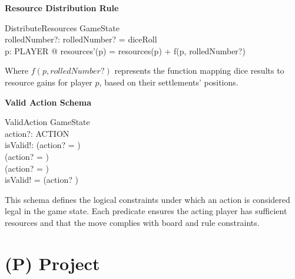 \documentclass{article}
\begin{document}
\textbf{Resource Distribution Rule}

\begin{schema}{DistributeResources}
    \Delta GameState \\
    rolledNumber?: 
    \where
    rolledNumber? = diceRoll \\
    \forall p: PLAYER @ resources'(p) = resources(p) + f(p, rolledNumber?)
\end{schema}


Where $f(p, rolledNumber?)$ represents the function mapping dice results to resource gains for player $p$, based on their settlements' positions. \newline

\textbf{Valid Action Schema}

\begin{schema}{ValidAction}
    GameState \\
    action?: ACTION \\
    isValid!: 
    \where
    (action? =  \implies {}) \\
    (action? =  \implies {}) \\
    (action? =  \implies {}) \\
    isValid! = (action? \in {})
\end{schema}


This schema defines the logical constraints under which an action is considered legal in the game state.
Each predicate ensures the acting player has sufficient resources and that the move complies with board and rule constraints.

\newpage{}


\section*{(P) Project}\label{sec:srs_project}
\renewcommand{\thesubsection}{P.\arabic{subsection}}
\setcounter{subsection}{0}
\end{document}
